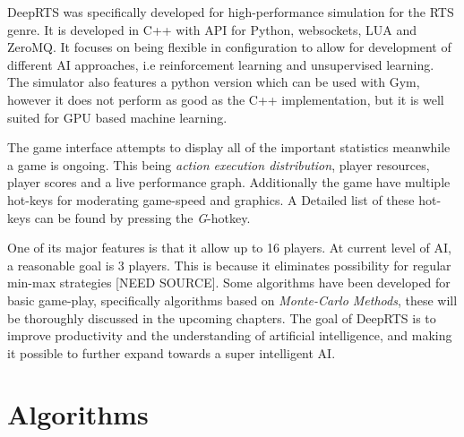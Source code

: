 \documentclass[fleqn,10pt]{article} %
\begin{document}
DeepRTS was specifically developed for high-performance simulation for the RTS genre. It is developed in C++ with API for Python, websockets, LUA and ZeroMQ. It focuses on being flexible in configuration to allow for development of different AI approaches, i.e reinforcement learning and unsupervised learning. The simulator also features a python version which can be used with Gym, however it does not perform as good as the C++ implementation, but it is well suited for GPU based machine learning.

The game interface attempts to display all of the important statistics meanwhile a game is ongoing. This being \textit{action execution distribution}, player resources, player scores and a live performance graph.
Additionally the game have multiple hot-keys for moderating game-speed and graphics. A Detailed list of these hot-keys can be found by pressing the \textit{G}-hotkey. 

One of its major features is that it allow up to 16 players. At current level of AI, a reasonable goal is 3 players. This is because it eliminates possibility for regular min-max strategies [NEED SOURCE]. Some algorithms have been developed for basic game-play, specifically algorithms based on \textit{Monte-Carlo Methods}, these will be thoroughly discussed in the upcoming chapters.
The goal of DeepRTS is to improve productivity and the understanding of artificial intelligence, and making it possible to further expand towards a super intelligent AI.


\section{Algorithms}
\end{document}
